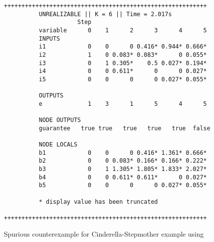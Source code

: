 \begin{figure}[!t]
\centering
 \begin{Verbatim}[fontsize=\scriptsize]
	 ++++++++++++++++++++++++++++++++++++++++++++++++++++++++++
	      UNREALIZABLE || K = 6 || Time = 2.017s
	                 Step
	      variable      0    1      2      3      4      5
	      INPUTS
	      i1            0    0      0 0.416* 0.944* 0.666*
	      i2            1    0 0.083* 0.083*      0 0.055*
	      i3            0    1 0.305*    0.5 0.027* 0.194*
	      i4            0    0 0.611*      0      0 0.027*
	      i5            0    0      0      0 0.027* 0.055*
	
	      OUTPUTS
	      e             1    3      1      5      4      5
	
	      NODE OUTPUTS
	      guarantee   true true   true   true   true  false
	
	      NODE LOCALS
	      b1            0    0      0 0.416* 1.361* 0.666*
	      b2            0    0 0.083* 0.166* 0.166* 0.222*
	      b3            0    1 1.305* 1.805* 1.833* 2.027*
	      b4            0    0 0.611* 0.611*      0 0.027*
	      b5            0    0      0      0 0.027* 0.055*
	
	      * display value has been truncated
	 ++++++++++++++++++++++++++++++++++++++++++++++++++++++++++
 \end{Verbatim}
\vspace{-1.5em}
\caption{Spurious counterexample for Cinderella-Stepmother example using \jsyn}
\label{fg:cex}
\end{figure}


